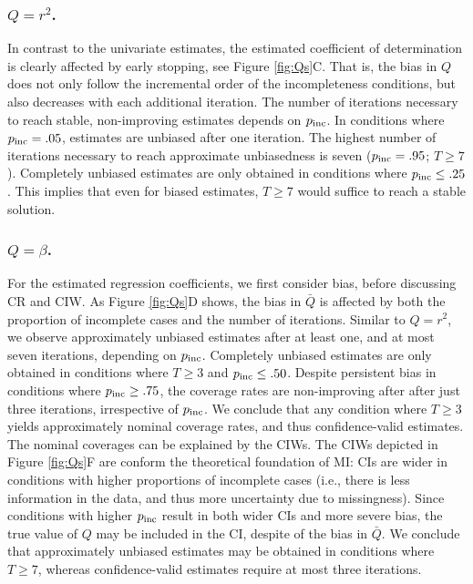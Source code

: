 \documentclass[Royal,times,sageh]{sagej}
\begin{document}
\hypertarget{qr2.}{%
\subsubsection{\texorpdfstring{\(Q=r^2\).}{Q=r\^{}2.}}\label{qr2.}}

In contrast to the univariate estimates, the estimated coefficient of determination is clearly affected by early stopping, see Figure \ref{fig:Qs}C. That is, the bias in \(Q\) does not only follow the incremental order of the incompleteness conditions, but also decreases with each additional iteration. The number of iterations necessary to reach stable, non-improving estimates depends on \(p_{\rm inc}\). In conditions where \(p_{\rm inc}=.05\), estimates are unbiased after one iteration. The highest number of iterations necessary to reach approximate unbiasedness is seven (\(p_{\rm inc}=.95\); \(T\geq7\)). Completely unbiased estimates are only obtained in conditions where \(p_{\rm inc}\leq.25\). This implies that even for biased estimates, \(T\geq7\) would suffice to reach a stable solution.

\hypertarget{qbeta.}{%
\subsubsection{\texorpdfstring{\(Q=\beta\).}{Q=\textbackslash beta.}}\label{qbeta.}}

For the estimated regression coefficients, we first consider bias, before discussing CR and CIW. As Figure \ref{fig:Qs}D shows, the bias in \(\bar{Q}\) is affected by both the proportion of incomplete cases and the number of iterations. Similar to \(Q=r^2\), we observe approximately unbiased estimates after at least one, and at most seven iterations, depending on \(p_{\rm inc}\). Completely unbiased estimates are only obtained in conditions where \(T\geq3\) and \(p_{\rm inc}\leq .50\). Despite persistent bias in conditions where \(p_{\rm inc}\geq.75\), the coverage rates are non-improving after after just three iterations, irrespective of \(p_{\rm inc}\). We conclude that any condition where \(T\geq3\) yields approximately nominal coverage rates, and thus confidence-valid estimates.
The nominal coverages can be explained by the CIWs. The CIWs depicted in Figure \ref{fig:Qs}F are conform the theoretical foundation of MI: CIs are wider in conditions with higher proportions of incomplete cases (i.e., there is less information in the data, and thus more uncertainty due to missingness). Since conditions with higher \(p_{\rm inc}\) result in both wider CIs and more severe bias, the true value of \(Q\) may be included in the CI, despite of the bias in \(\bar{Q}\).
We conclude that approximately unbiased estimates may be obtained in conditions where \(T\geq7\), whereas confidence-valid estimates require at most three iterations. \newline
\end{document}
